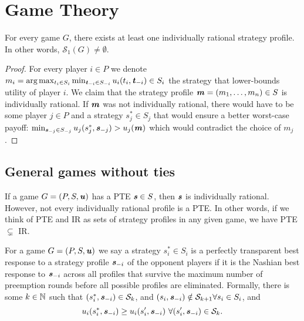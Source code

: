 \chapter{Game Theory}

\begin{lemma}
	For every game $G$, there exists at least one individually rational strategy profile.
	In other words, $\mathcal{S}_1(G) \ne \emptyset$.
\end{lemma}

\begin{proof}
	For every player $i \in P$ we denote $m_i = \text{arg} \max_{t_i \in S_i} \min_{\boldsymbol{\mathit{t}}_{-i} \in S_{-i}} u_i(t_i, \boldsymbol{\mathit{t}}_{-i}) \in S_i$ the strategy that lower-bounds utility of player $i$.
	We claim that the strategy profile $\boldsymbol{\mathit{m}} = (m_1, \dots, m_n) \in S$ is individually rational.
	If $\boldsymbol{\mathit{m}}$ was not individually rational, there would have to be some player $j \in P$ and a strategy $s_j^* \in S_j$ that would ensure a better worst-case payoff: $\min_{\boldsymbol{\mathit{s}}_{-j} \in S_{-j}}u_j(s_j^*, \boldsymbol{\mathit{s}}_{-j}) > u_j(\boldsymbol{\mathit{m}})$ which would contradict the choice of $m_j$.
\end{proof}

\section{General games without ties}

\begin{observation}
	\label{th:pte-subset-ir}
	If a game $G = (P, S, \boldsymbol{\mathit{u}})$ has a PTE $\boldsymbol{\mathit{s}} \in S$, then $\boldsymbol{\mathit{s}}$ is individually rational.
	However, not every individually rational profile is a PTE.
	In other words, if we think of PTE and IR as sets of strategy profiles in any given game, we have PTE $\subsetneq$ IR.
\end{observation}

\begin{definition}
	For a game $G = (P, S, \boldsymbol{\mathit{u}})$ we say a strategy $s_i^* \in S_i$ is a perfectly transparent best response to a strategy profile $\boldsymbol{\mathit{s}}_{-i}$ of the opponent players if it is the Nashian best response to $\boldsymbol{\mathit{s}}_{-i}$ across all profiles that survive the maximum number of preemption rounds before all possible profiles are eliminated.
	Formally, there is some $k \in \mathbb{N}$ such that $(s_i^*, \boldsymbol{\mathit{s}}_{-i}) \in \mathcal{S}_k$, and $(s_i, \boldsymbol{\mathit{s}}_{-i}) \notin \mathcal{S}_{k+1} \forall s_i \in S_i$, and
	\[
		u_i(s_i^*, \vecs_{-i}) \ge u_i(s_i', \vecs_{-i})\ \forall (s_i', \vecs_{-i}) \in \mathcal{S}_k.
	\]
\end{definition}

